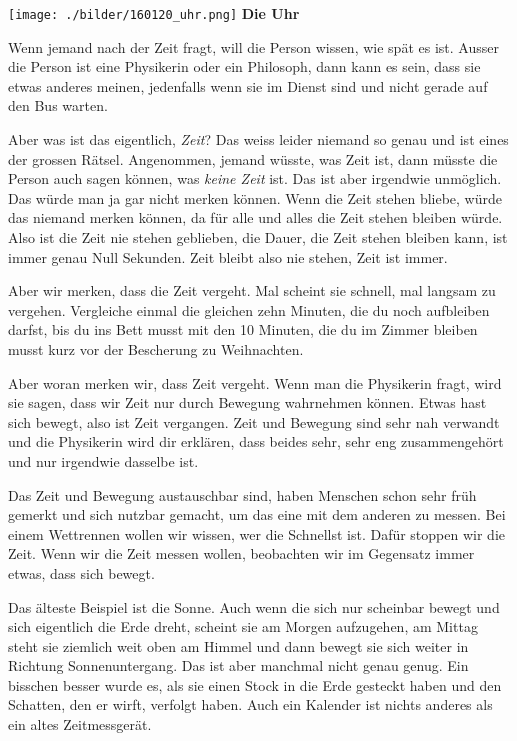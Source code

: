 \texttt{[image: ./bilder/160120\_uhr.png]}
\vskip 1cm
{\Huge\color{blue}\hfill\textsf{\textbf{Die Uhr}}}
\newpage
\lettrine[lines=2, lhang=.2, loversize=.25, lraise=0.05, findent=0.1em, nindent=0em]{W}{}enn jemand nach der Zeit fragt, will die Person wissen,
wie spät es ist. Ausser die Person ist eine Physikerin oder ein Philosoph, dann
kann es sein, dass sie etwas anderes meinen, jedenfalls wenn sie im Dienst sind
und nicht gerade auf den Bus warten.

Aber was ist das eigentlich, \textit{Zeit}? Das weiss leider niemand so genau
und ist eines der grossen Rätsel. Angenommen, jemand wüsste, was Zeit ist, dann
müsste die Person auch sagen können, was \textit{keine Zeit} ist. Das ist aber
irgendwie unmöglich. Das würde man ja gar nicht merken können. Wenn die Zeit
stehen bliebe, würde das niemand merken können, da für alle und alles die Zeit
stehen bleiben würde. Also ist die Zeit nie stehen geblieben, die Dauer, die
Zeit stehen bleiben kann, ist immer genau Null Sekunden. Zeit bleibt also nie
stehen, Zeit ist immer.

Aber wir merken, dass die Zeit vergeht. Mal scheint sie schnell, mal langsam zu
vergehen. Vergleiche einmal die gleichen zehn Minuten, die du noch aufbleiben
darfst, bis du ins Bett musst mit den 10 Minuten, die du im Zimmer bleiben
musst kurz vor der Bescherung zu Weihnachten.

Aber woran merken wir, dass Zeit vergeht. Wenn man die Physikerin fragt, wird
sie sagen, dass wir Zeit nur durch Bewegung wahrnehmen können. Etwas hast sich
bewegt, also ist Zeit vergangen. Zeit und Bewegung sind sehr nah verwandt und
die Physikerin wird dir erklären, dass beides sehr, sehr eng zusammengehört und
nur irgendwie dasselbe ist.

Das Zeit und Bewegung austauschbar sind, haben Menschen schon sehr früh gemerkt
und sich nutzbar gemacht, um das eine mit dem anderen zu messen. Bei einem
Wettrennen wollen wir wissen, wer die Schnellst ist. Dafür stoppen wir die
Zeit. Wenn wir die Zeit messen wollen, beobachten wir im Gegensatz immer etwas,
dass sich bewegt.

Das älteste Beispiel ist die Sonne. Auch wenn die sich nur scheinbar bewegt und
sich eigentlich die Erde dreht, scheint sie am Morgen aufzugehen, am Mittag
steht sie ziemlich weit oben am Himmel und dann bewegt sie sich weiter in
Richtung Sonnenuntergang. Das ist aber manchmal nicht genau genug. Ein bisschen
besser wurde es, als sie einen Stock in die Erde gesteckt haben und den
Schatten, den er wirft, verfolgt haben. Auch ein Kalender ist nichts anderes
als ein altes Zeitmessgerät.

